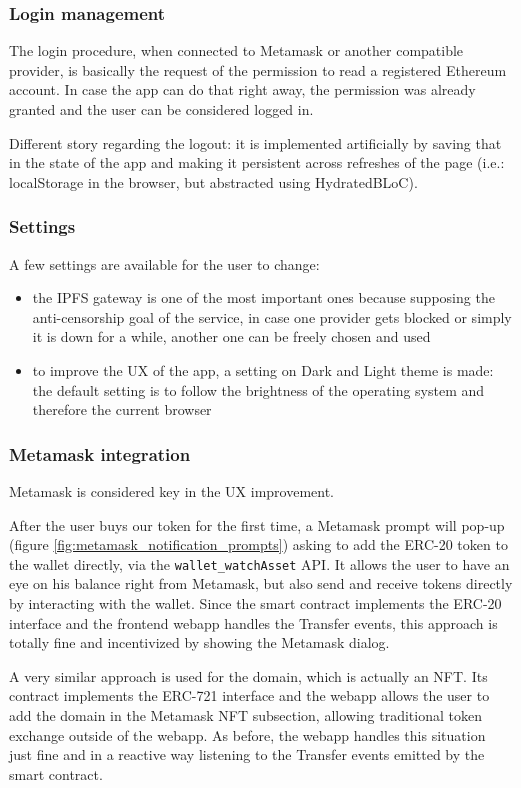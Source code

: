 \documentclass[main.tex]{subfiles}
\begin{document}
\subsubsection{Login management}
The login procedure, when connected to Metamask or another compatible provider, is basically the request of the permission to read a registered Ethereum account.
In case the app can do that right away, the permission was already granted and the user can be considered logged in.

Different story regarding the logout: it is implemented artificially by saving that in the state of the app and making it persistent across refreshes of the page (i.e.: localStorage in the browser, but abstracted using HydratedBLoC).

\subsubsection{Settings}
A few settings are available for the user to change:
\begin{itemize}
    \item the IPFS gateway is one of the most important ones because supposing the anti-censorship goal of the service, in case one provider gets blocked or simply it is down for a while, another one can be freely chosen and used
    \item to improve the UX of the app, a setting on Dark and Light theme is made: the default setting is to follow the brightness of the operating system and therefore the current browser
\end{itemize}

\subsubsection{Metamask integration}
Metamask is considered key in the UX improvement.

After the user buys our token for the first time, a Metamask prompt will pop-up (figure \ref{fig:metamask_notification_prompts}) asking to add the ERC-20 token to the wallet directly, via the \texttt{wallet\_watchAsset} API. It allows the user to have an eye on his balance right from Metamask, but also send and receive tokens directly by interacting with the wallet.
Since the smart contract implements the ERC-20 interface and the frontend webapp handles the Transfer events, this approach is totally fine and incentivized by showing the Metamask dialog.

A very similar approach is used for the domain, which is actually an NFT. Its contract implements the ERC-721 interface and the webapp allows the user to add the domain in the Metamask NFT subsection, allowing traditional token exchange outside of the webapp. As before, the webapp handles this situation just fine and in a reactive way listening to the Transfer events emitted by the smart contract.
\end{document}

